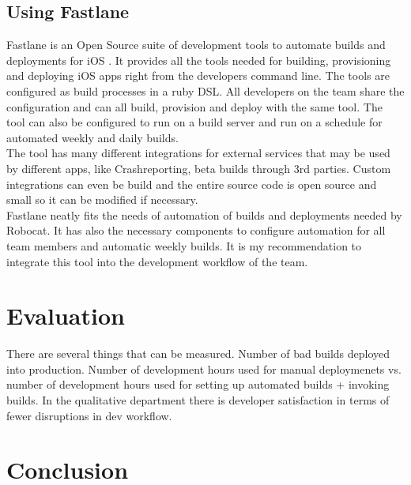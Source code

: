 \documentclass{ituthesis}
\begin{document}
\section{Using Fastlane}
\label{sec:using_fastlane}

Fastlane is an Open Source suite of development tools to automate builds and deployments for iOS \cite{Krause2015}. It provides all the tools needed for building, provisioning and deploying iOS apps right from the developers command line. The tools are configured as build processes in a ruby DSL. All developers on the team share the configuration and can all build, provision and deploy with the same tool. The tool can also be configured to run on a build server and run on a schedule for automated weekly and daily builds.\\

The tool has many different integrations for external services that may be used by different apps, like Crashreporting, beta builds through 3rd parties. Custom integrations can even be build and the entire source code is open source and small so it can be modified if necessary.\\

Fastlane neatly fits the needs of automation of builds and deployments needed by Robocat. It has also the necessary components to configure automation for all team members and automatic weekly builds. It is my recommendation to integrate this tool into the development workflow of the team.

\chapter{Evaluation}

There are several things that can be measured. Number of bad builds deployed into production. Number of development hours used for manual deploymenets vs. number of development hours used for setting up automated builds + invoking builds. In the qualitative department there is developer satisfaction in terms of fewer disruptions in dev workflow. 

\chapter{Conclusion}

\clearpage

\nocite{Humble2010}
\nocite{Bellomo2014}
\nocite{beck2001agile}

\end{document}
